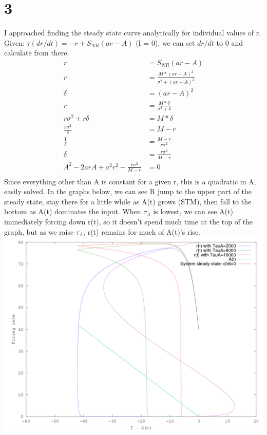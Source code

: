 \documentclass[11pt]{article}
\begin{document}
\newpage
\section*{3}
I approached finding the steady state curve analytically for individual values of r.  Given:
$\tau(dr/dt) = -r + S_{NR}(ar - A)$ (I = 0), we can set $dr/dt$ to 0 and calculate from there.
\begin{align*}
  r &= S_{NR}(ar-A)\\
  r &= \frac{M*(ar-A)^2}{\sigma^2 + (ar-A)^2}\\
  \delta &= (ar - A)^2\\
  r &= \frac{M*\delta}{\sigma^2 + \delta}\\
  r\sigma^2 + r\delta &= M*\delta\\
  \frac{r\sigma^2}{\delta} &= M-r\\
  \frac{1}{\delta} &= \frac{M-r}{r\sigma^2}\\
  \delta &= \frac{r\sigma^2}{M-r}\\
  A^2 - 2arA + a^2r^2 - \frac{r\sigma^2}{M-r} &= 0\\
\end{align*}
Since everything other than A is constant for a given r, this is a quadratic in A, easily solved.
In the graphs below, we can see R jump to the upper part of the steady state,
stay there for a little while as A(t) grows (STM), 
then fall to the bottom as A(t) dominates the input.
When $\tau_A$ is lowest, we can see A(t) immediately forcing
down r(t), so it doesn't spend much time at the top of the graph,
but as we raise $\tau_A$, r(t) remains for much of A(t)'s rise.\\
\includegraphics[width=6in]{3.png}\\
\end{document}
